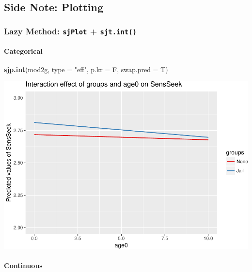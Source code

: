 \documentclass[]{article}
\newenvironment{Shaded}{\begin{snugshade}}{\end{snugshade}}
\newcommand{\KeywordTok}[1]{\textcolor[rgb]{0.13,0.29,0.53}{\textbf{#1}}}
\newcommand{\DataTypeTok}[1]{\textcolor[rgb]{0.13,0.29,0.53}{#1}}
\newcommand{\StringTok}[1]{\textcolor[rgb]{0.31,0.60,0.02}{#1}}
\newcommand{\NormalTok}[1]{#1}
\let\oldparagraph\paragraph
\renewcommand{\paragraph}[1]{\oldparagraph{#1}\mbox{}}
\begin{document}
\subsection{Side Note: Plotting}\label{side-note-plotting}

\subsubsection{\texorpdfstring{Lazy Method: \texttt{sjPlot} +
\texttt{sjt.int()}}{Lazy Method: sjPlot + sjt.int()}}\label{lazy-method-sjplot-sjt.int}

\paragraph{Categorical}\label{categorical}

\small

\begin{Shaded}
\begin{Highlighting}[]
\KeywordTok{sjp.int}\NormalTok{(mod2g, }\DataTypeTok{type =} \StringTok{"eff"}\NormalTok{, }\DataTypeTok{p.kr =}\NormalTok{ F, }\DataTypeTok{swap.pred =}\NormalTok{ T)}
\end{Highlighting}
\end{Shaded}

\includegraphics{Conditional_Models_doc_files/figure-latex/unnamed-chunk-30-1.pdf}

\paragraph{Continuous}\label{continuous}

\small
\end{document}
